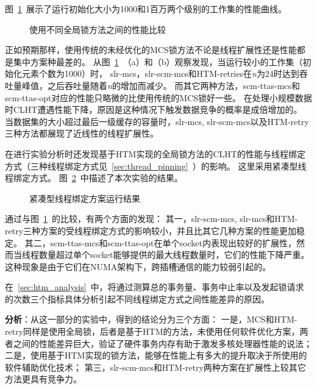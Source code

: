 图~\ref{fig:htm_global}~展示了运行初始化大小为1000和1百万两个级别的工作集的性能曲线。
\begin{figure}[htbp]
\centering
\caption{使用不同全局锁方法之间的性能比较}
\label{fig:htm_global}
\end{figure}
正如预期那样，使用传统的未经优化的MCS锁方法不论是线程扩展性还是性能都是集中方案种最差的。
从图~\ref{fig:htm_global}~（a）和（b）观察发现，当运行较小的工作集（初始化元素个数为1000）时，
slr-mcs，slr-scm-mcs和HTM-retries在\textit{n}为24时达到吞吐量峰值，之后吞吐量随着\textit{n}的增加而减少。
而其它两种方法，scm-ttas-mcs和scm-ttas-opt对应的性能只略微的比使用传统的MCS锁好一些。
在处理小规模数据时CLHT遭遇性能下降，原因是这种情况下触发数据竞争的概率是成倍增加的。
当数据集的大小超过最后一级缓存的容量时，slr-mcs, slr-scm-mcs以及HTM-retry三种方法都展现了近线性的线程扩展性。

在进行实验分析时还发现基于HTM实现的全局锁方法的CLHT的性能与线程绑定方式（三种线程绑定方式见~\ref{sec:thread_pinning}~）的影响。
这里采用紧凑型线程绑定方式。
图~\ref{fig:htm_pinning}~中描述了本次实验的结果。
\begin{figure}[htbp]
\centering
\caption{紧凑型线程绑定方案运行结果}
\label{fig:htm_pinning}
\end{figure}
通过与图~\ref{fig:htm_global}~的比较，有两个方面的发现：
其一，slr-scm-mcs, slr-mcs和HTM-retry三种方案的受线程绑定方式的影响较小，并且比其它几种方案的性能更加稳定。
其二，scm-ttas-mcs和scm-ttas-opt在单个socket内表现出较好的扩展性，然而当线程数量超过单个socket能够提供的最大线程数量时，它们的性能下降严重。
这种现象是由于它们在NUMA架构下，跨插槽通信的能力较弱引起的。

在~\ref{sec:htm_analysis}~中，将通过测算总的事务量、事务中止率以及发起锁请求的次数三个指标具体分析引起不同线程绑定方式之间性能差异的原因。

\textbf{分析}：从这一部分的实验中，得到的结论分为三个方面：
一是，MCS和HTM-retry同样是使用全局锁，后者是基于HTM的方法，未使用任何软件优化方案，两者之间的性能差异巨大，验证了硬件事务内存有助于激发多核处理器性能的说法；
二是，使用基于HTM实现的锁方法，能够在性能上有多大的提升取决于所使用的软件辅助优化技术；
第三，slr-scm-mcs和HTM-retry两种方案在扩展性上较其它方法更具有竞争力。



